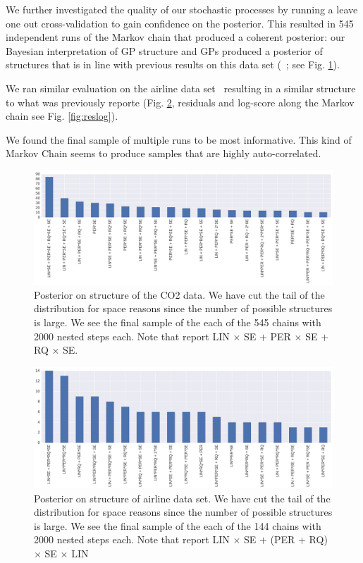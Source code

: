 \documentclass{article} %
\begin{document}
We further investigated the quality of our stochastic processes by running a leave one out cross-validation to gain confidence on the posterior. This resulted in 545 independent runs of the Markov chain that produced a coherent posterior: our Bayesian interpretation of GP structure and GPs produced a posterior of structures that is in line with previous results on this data set (~\citealp*{duvenaud2013structure}; see Fig. \ref{fig:structureCo2}).

We ran similar evaluation on the airline data set~\citep{} resulting in a similar structure to what was previously reporte (Fig. \ref{fig:structureAir}, residuals and log-score along the Markov chain see Fig. \ref{fig:reslog}).

We found the final sample of multiple runs to be most informative. This kind of Markov Chain seems to produce samples that are highly auto-correlated.

\begin{figure}
\centering
    \includegraphics[width=\textwidth]{figs/structureCo2b.png}
    \caption{Posterior on structure of the CO2 data. We have cut the tail of the distribution for space reasons since the number of possible structures is large. We see the final sample of the each of the 545 chains with 2000 nested steps each. Note that \citet{duvenaud2013structure} report LIN $\times$ SE $+$ PER $\times$ SE $+$ RQ $\times$ SE.}\label{fig:structureCo2}
\end{figure}

\begin{figure}
\centering
    \includegraphics[width=\textwidth]{figs/structureAirlinec.png}
    \caption{Posterior on structure of airline data set. We have cut the tail of the distribution for space reasons since the number of possible structures is large. We see the final sample of the each of the 144 chains with 2000 nested steps each. Note that \citet{duvenaud2013structure} report LIN $\times$ SE $+$ (PER  + RQ) $\times$ SE $\times$ LIN}\label{fig:structureAir}
\end{figure}
\end{document}
